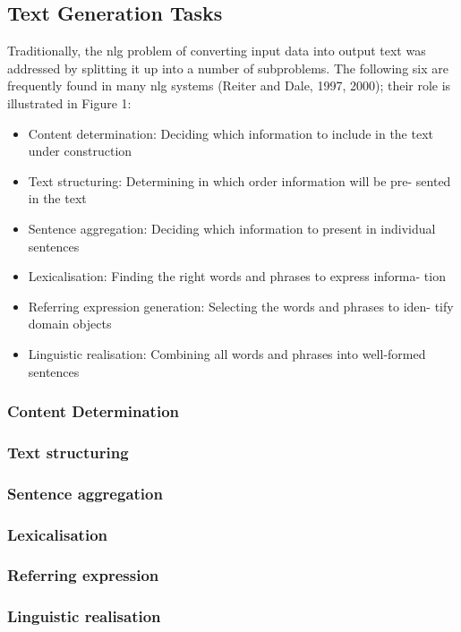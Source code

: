 \subsection{Text Generation Tasks}
Traditionally, the nlg problem of converting input data into output text was addressed by splitting it up into a number of subproblems. The following six are frequently found in many nlg systems (Reiter and Dale, 1997, 2000); their role is illustrated in Figure 1:
\begin{itemize}
	\item Content determination: Deciding which information to include in the text under construction
	\item Text structuring: Determining in which order information will be pre- sented in the text
	\item Sentence aggregation: Deciding which information to present in individual sentences
	\item Lexicalisation: Finding the right words and phrases to express informa- tion
	\item Referring expression generation: Selecting the words and phrases to iden- tify domain objects
	\item Linguistic realisation: Combining all words and phrases into well-formed sentences
\end{itemize}

\subsubsection{Content Determination}
\subsubsection{Text structuring}
\subsubsection{Sentence aggregation}
\subsubsection{Lexicalisation}
\subsubsection{Referring expression}
\subsubsection{Linguistic realisation}


